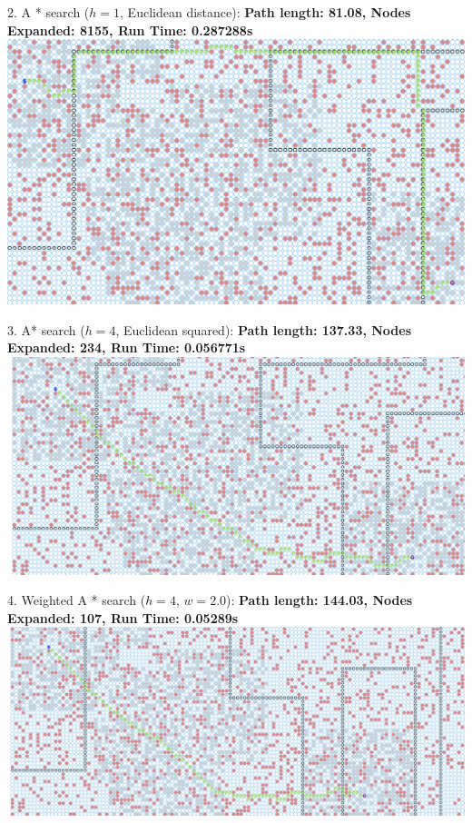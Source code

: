 \documentclass[12pt, letterpaper]{article}
\begin{document}
2. A * search ($h=1$, Euclidean distance): \newline
\medskip
\textbf{Path length: 81.08, Nodes Expanded: 8155,	Run Time: 0.287288s}\newline
\noindent \includegraphics[scale=0.25]{"b-map5-1-a-real"}\newline

3. A* search ($h=4$, Euclidean squared): \newline
\medskip
\textbf{Path length: 137.33, Nodes Expanded: 234,	Run Time: 0.056771s}\newline
\noindent \includegraphics[scale=0.21]{"b-map5-1-a"}\newline

4. Weighted A * search ($h=4$, $w=2.0$):\newline
\medskip
\textbf{Path length: 144.03, Nodes Expanded: 107,	Run Time: 0.05289s}\newline
\noindent \includegraphics[scale=0.2]{"b-map5-1-w-2"}\newline
\end{document}
